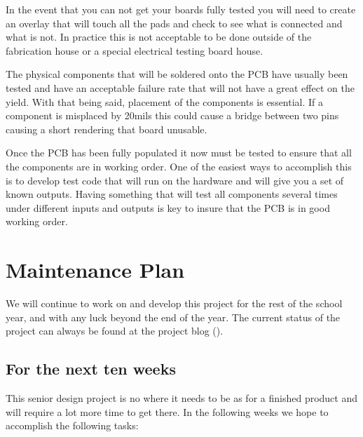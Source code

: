 \documentclass{article}
\numberwithin{equation}{section} %
\begin{document}
In the event that you can not get your boards fully tested you will need to create an overlay that will touch all the pads and check to see what is connected and what is not. In practice this is not acceptable to be done outside of the fabrication house or a special electrical testing board house.

The physical components that will be soldered onto the PCB have usually been tested and have an acceptable failure rate that will not have a great effect on the yield. With that being said, placement of the components is essential. If a component is misplaced by 20mils this could cause a bridge between two pins causing a short rendering that board unusable.

Once the PCB has been fully populated it now must be tested to ensure that all the components are in working order. One of the easiest ways to accomplish this is to develop test code that will run on the hardware and will give you a set of known outputs. Having something that will test all components several times under different inputs and outputs is key to insure that the PCB is in good working order.

\section{Maintenance Plan}
We will continue to work on and develop this project for the rest of the school year, and with any luck beyond the end of the year. The current status of the project can always be found at the project blog (\cite{anzhelka_blog}).

\subsection{For the next ten weeks} \label{subsec:maintenance_plan_10}
This senior design project is no where it needs to be as for a finished product and will require a lot more time to get there. In the following weeks we hope to accomplish the following tasks:
\end{document}
